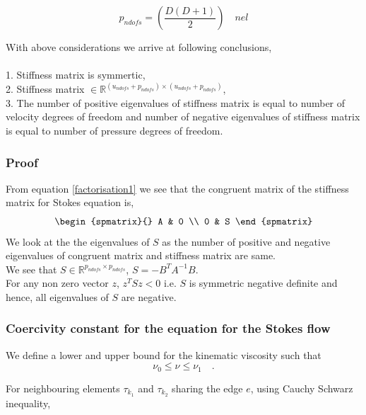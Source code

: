 \documentclass[a4paper,openany]{book}
\begin{document}
\begin{equation} \label{pndofs}
p_{ndofs} = \left(\frac{D(D+1)}{2}\right) \quad nel
\end{equation}

With above considerations we arrive at following conclusions, \\
${}$\\
1. Stiffness matrix is symmertic, \\
2. Stiffness matrix $ \in \mathbb{R}^{(u_{ndofs} + p_{ndofs}) \times (u_{ndofs} + p_{ndofs})}$,\\
3. The number of positive eigenvalues of stiffness matrix is equal to number of velocity degrees of freedom and number of negative eigenvalues of stiffness matrix is equal to number of pressure degrees of freedom.\\

\subsubsection{Proof}

From equation \eqref{factorisation1} we see that the congruent matrix of the stiffness matrix for Stokes equation is,
\begin{equation}
\begin{spmatrix}{}
    A & 0 \\
    0 & S
\end{spmatrix}
\end{equation}
We look at the the eigenvalues of $S$ as the number of positive and negative eigenvalues of congruent matrix and stiffness matrix are same.\\
We see that $S \in \mathbb{R}^{p_{ndofs} \times p_{ndofs}}$, $S = - B^T A^{-1} B$.\\ 
For any non zero vector $z$, $z^T S z < 0$ i.e. $S$ is symmetric negative definite and hence, all eigenvalues of $S$ are negative.

\subsubsection{Coercivity constant for the equation for the Stokes flow} \label{basics}

We define a lower and upper bound for the kinematic viscosity such that \\
\begin{equation}
\nu_0 \leq \nu \leq \nu_1 \quad \textrm{.}
\end{equation}

For neighbouring elements $\tau_{k_1}$ and $\tau_{k_2}$ sharing the edge $e$,  using Cauchy Schwarz inequality, 
\end{document}
